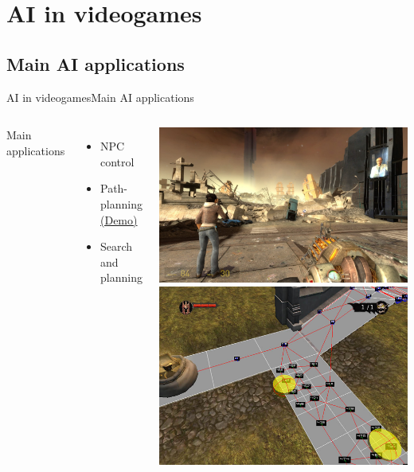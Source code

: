 \documentclass[10pt,compress]{beamer} %
\begin{document}
\section{AI in videogames}
\subsection{Main AI applications}
\begin{frame}{AI in videogames}{Main AI applications}
    \begin{columns}
	\vspace{-0.5cm}
	   Main applications
	   \begin{itemize}
			\item NPC control
			\item Path-planning \href{http://qiao.github.io/PathFinding.js/visual/}{(Demo)}
			\item Search and planning
		\end{itemize}

	\includegraphics[width=0.8\linewidth]{figs/hl2}\\
	\includegraphics[width=0.8\linewidth]{figs/pp}\\
	\end{columns}
\end{frame}
\end{document}
